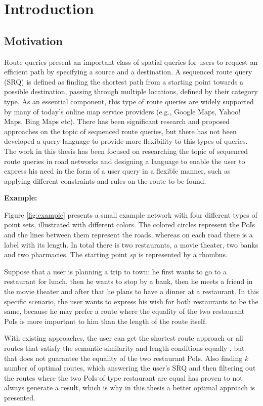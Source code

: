 \chapter{Introduction}
\label{sec:intro}

\section{Motivation}
\label{sec:motivation}
Route queries present an important class of spatial queries for users to request an efficient path by specifying a source and a destination. A sequenced route query (SRQ) is defined as finding the shortest path from a starting point towards a possible destination, passing through multiple locations, defined by their category type. As an essential component, this type of route queries are widely supported by many of today's online map service providers (e.g., Google Maps, Yahoo! Maps, Bing Maps etc). There has been significant research and proposed approaches on the topic of sequenced route queries, but there has not been developed a query language to provide more flexibility to this types of queries. The work in this thesis has been focused on researching the topic of sequenced route queries in road networks and designing a language to enable the user to express his need in the form of a user query in a flexible manner, such as applying different constraints and rules on the route to be found.

\textbf{Example:}

Figure \ref{fig:example} presents a small example network with four different types of point sets, illustrated with different colors. The colored circles represent the PoIs and the lines between them represent the roads, whereas on each road there is a label with its length. In total there is two restaurants, a movie theater, two banks and two pharmacies. The starting point \textit{sp} is represented by a rhombus.

Suppose that a user is planning a trip to town: he first wants to go to a restaurant for lunch, then he wants to stop by a bank, then he meets a friend in the movie theater and after that he plans to have a dinner at a restaurant. In this specific scenario, the user wants to express his wish for both restaurants to be the same, because he may prefer a route where the equality of the two restaurant PoIs is more important to him than the length of the route itself.

With existing approaches, the user can get the shortest route \cite{OSR} approach or all routes that satisfy the semantic similarity and length conditions equally \cite{semanticSRQ}, but that does not guarantee the equality of the two restaurant PoIs. Also finding \textit{k} number of optimal routes, which answering the user's SRQ and then filtering out the routes where the two PoIs of type restaurant are equal has proven to not always generate a result, which is why in this thesis a better optimal approach is presented.

